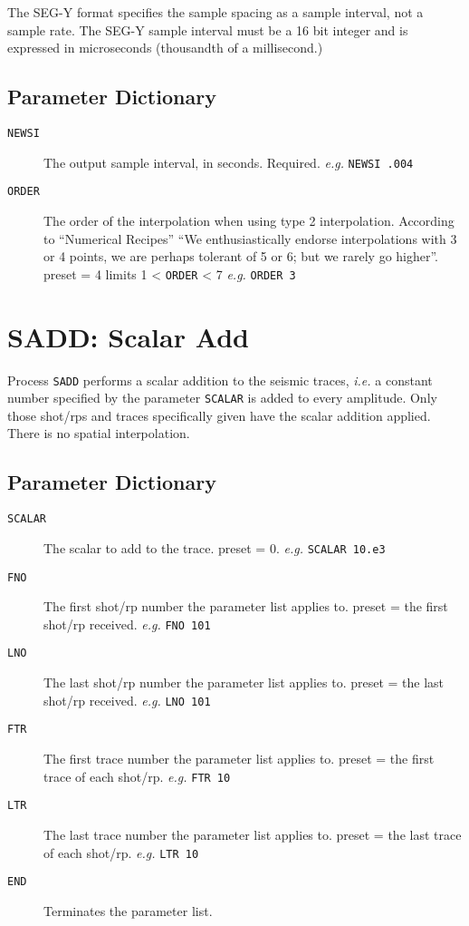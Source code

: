 The SEG-Y format specifies the sample spacing as a sample interval,
not a sample rate.  The SEG-Y sample interval must be a 16 bit integer
and is expressed in microseconds (thousandth of a millisecond.)

\subsection{Parameter Dictionary}

\begin{description}
\item[\texttt{NEWSI}] The output sample interval, in seconds.
         Required.            \textit{e.g.}   \texttt{NEWSI  .004}

\item[\texttt{ORDER}] The order of the interpolation when using type 2 interpolation.
         According to ``Numerical Recipes'' \cite{WHPress1989a} \enquote{We enthusiastically endorse
         interpolations with 3 or 4 points, we are perhaps tolerant of
         5 or 6; but we rarely go higher}.
         \Gls{preset} = 4   limits   1 < \texttt{ORDER} < 7        \textit{e.g.}   \texttt{ORDER 3}
\end{description}

\section{SADD: Scalar Add}
\label{cmd_sadd}

Process \texttt{SADD} performs a scalar addition to the seismic traces, \textit{i.e.} a
constant number specified by the parameter \texttt{SCALAR} is added to every
amplitude.  Only those \gls{shot}/\glspl{rp} and traces specifically given have the
scalar addition applied.  There is no spatial interpolation.


\subsection{Parameter Dictionary}

\begin{description}
\item[\texttt{SCALAR}] The scalar to add to the trace.  \Gls{preset} = 0. \textit{e.g.}   \texttt{SCALAR 10.e3}
\item[\texttt{FNO}] The first \gls{shot}/\gls{rp} number the parameter list applies to.  \Gls{preset} = the first \gls{shot}/\gls{rp} received.    \textit{e.g.}   \texttt{FNO 101}
\item[\texttt{LNO}] The last \gls{shot}/\gls{rp} number the parameter list applies to.  \Gls{preset} = the last \gls{shot}/\gls{rp} received.    \textit{e.g.}   \texttt{LNO 101}
\item[\texttt{FTR}] The first trace number the parameter list applies to.  \Gls{preset} = the first trace of each \gls{shot}/\gls{rp}.    \textit{e.g.}   \texttt{FTR 10}
\item[\texttt{LTR}] The last trace number the parameter list applies to.  \Gls{preset} = the last trace of each \gls{shot}/\gls{rp}.    \textit{e.g.}   \texttt{LTR 10}
\item[\texttt{END}] Terminates the parameter list.
\end{description}

